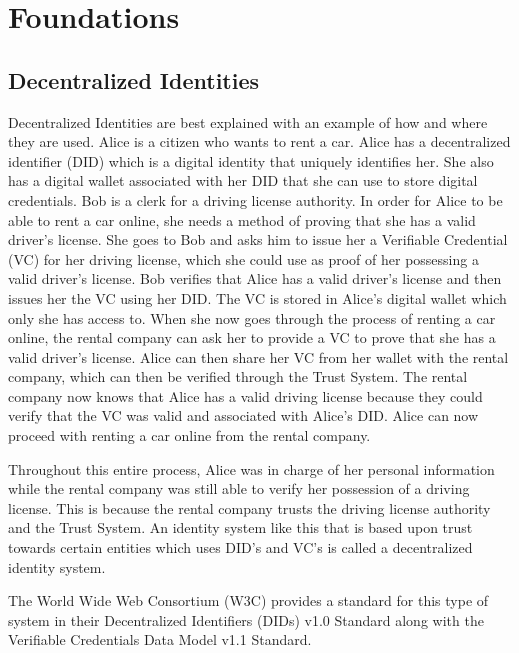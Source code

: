 \chapter{Foundations}
\label{cha:foundations}


\section{Decentralized Identities}

Decentralized Identities are best explained with an example of how and where they are used.
Alice is a citizen who wants to rent a car. Alice has a decentralized identifier (DID) which is a digital identity
that uniquely identifies her. She also has a digital wallet associated with her DID that she can use
to store digital credentials. Bob is a clerk for a driving license authority.
In order for Alice to be able to rent a car online, she needs a method of proving that she has a valid
driver's license. She goes to Bob and asks him to issue her a Verifiable Credential (VC) for her driving
license, which she could use as proof of her possessing a valid driver's license.
Bob verifies that Alice has a valid driver's license and then issues her the VC using her DID.
The VC is stored in Alice's digital wallet which only she has access to.
When she now goes through the process of renting a car online, the rental company
can ask her to provide a VC to prove that she has a valid driver's license.
Alice can then share her VC from her wallet with the rental company, which can then be
verified through the Trust System. The rental company now knows that Alice has a valid driving license
because they could verify that the VC was valid and associated with Alice's DID.
Alice can now proceed with renting a car online from the rental company.

Throughout this entire process, Alice was in charge of her personal information while
the rental company was still able to verify her possession of a driving license. This is because
the rental company trusts the driving license authority and the Trust System.
An identity system like this that is based upon trust towards certain entities which uses DID's and VC's is called
a decentralized identity system.

The World Wide Web Consortium (W3C) provides a standard for this type of system in their Decentralized Identifiers (DIDs) v1.0
Standard along with the Verifiable Credentials Data Model v1.1 Standard.


